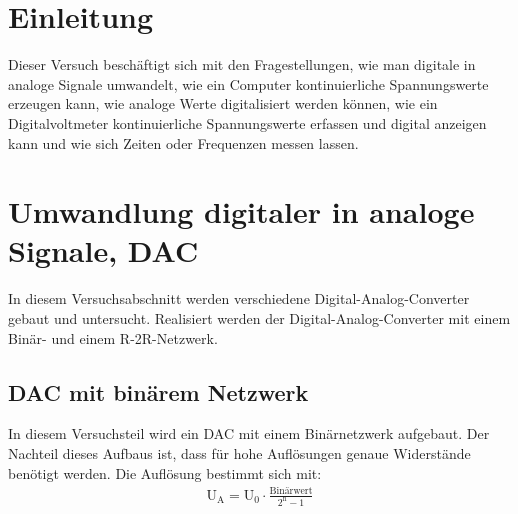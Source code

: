 \documentclass[12pt,a4paper]{article}
\begin{document}
\newpage
\tableofcontents
\newpage
\section{Einleitung}

Dieser Versuch beschäftigt sich mit den Fragestellungen, wie man digitale in analoge Signale umwandelt, wie ein Computer kontinuierliche Spannungswerte erzeugen kann, wie analoge Werte digitalisiert werden können, wie ein Digitalvoltmeter kontinuierliche Spannungswerte erfassen und digital anzeigen kann und wie sich Zeiten oder Frequenzen messen lassen.

\section{Umwandlung digitaler in analoge Signale, DAC}

In diesem Versuchsabschnitt werden verschiedene Digital-Analog-Converter gebaut und untersucht. Realisiert werden der Digital-Analog-Converter mit einem Binär- und einem R-2R-Netzwerk. 

\subsection{DAC mit binärem Netzwerk}

In diesem Versuchsteil wird ein DAC mit einem Binärnetzwerk aufgebaut. Der Nachteil dieses Aufbaus ist, dass für hohe Auflösungen genaue Widerstände benötigt werden. Die Auflösung bestimmt sich mit:
\begin{align}
\text{U}_\text{A}=\text{U}_0 \cdot \frac{\text{Binärwert}}{2^\text{n}-1}
\label{eqn:binaer}
\end{align}
\end{document}

